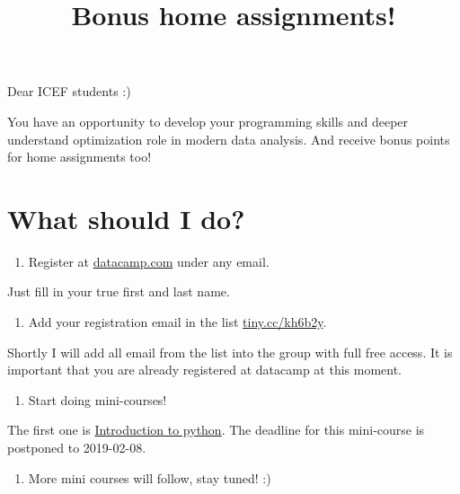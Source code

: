 \documentclass[11pt,russian,]{article}
\title{Bonus home assignments!}
\author{}
\date{}
\providecommand{\tightlist}{%
  \setlength{\itemsep}{0pt}\setlength{\parskip}{0pt}}
\begin{document}
\maketitle

Dear ICEF students :)

You have an opportunity to develop your programming skills and deeper
understand optimization role in modern data analysis. And receive bonus
points for home assignments too!

\hypertarget{what-should-i-do}{%
\section{What should I do?}\label{what-should-i-do}}

\begin{enumerate}
\def\labelenumi{\arabic{enumi}.}
\tightlist
\item
  Register at \href{https://datacamp.com}{datacamp.com} under any email.
\end{enumerate}

Just fill in your true first and last name.

\begin{enumerate}
\def\labelenumi{\arabic{enumi}.}
\setcounter{enumi}{1}
\tightlist
\item
  Add your registration email in the list
  \href{https://tiny.cc/kh6b2y}{tiny.cc/kh6b2y}.
\end{enumerate}

Shortly I will add all email from the list into the group with full free
access. It is important that you are already registered at datacamp at
this moment.

\begin{enumerate}
\def\labelenumi{\arabic{enumi}.}
\setcounter{enumi}{2}
\tightlist
\item
  Start doing mini-courses!
\end{enumerate}

The first one is
\href{https://www.datacamp.com/courses/intro-to-python-for-data-science}{Introduction
to python}. The deadline for this mini-course is postponed to
2019-02-08.

\begin{enumerate}
\def\labelenumi{\arabic{enumi}.}
\setcounter{enumi}{3}
\tightlist
\item
  More mini courses will follow, stay tuned! :)
\end{enumerate}
\end{document}
